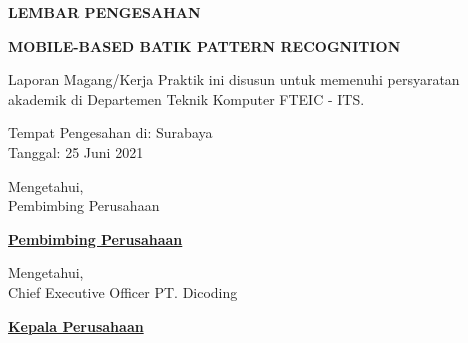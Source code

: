 \begin{center}
  {\Large \textbf{LEMBAR PENGESAHAN}}
  \vspace{6ex}


  {\large \textbf{MOBILE-BASED BATIK PATTERN RECOGNITION}}
  \vspace{6ex}

  Laporan Magang/Kerja Praktik ini disusun untuk memenuhi persyaratan akademik di Departemen Teknik Komputer FTEIC - ITS.
  \vspace{2ex}

  Tempat Pengesahan di: Surabaya \\
  Tanggal: 25 Juni 2021
  \vspace{8ex}

  Mengetahui, \\
  Pembimbing Perusahaan
  \vspace{12ex}

  \textbf{\underline{Pembimbing Perusahaan}}
  \vspace{8ex}

  Mengetahui, \\
  Chief Executive Officer PT. Dicoding
  \vspace{12ex}

  \textbf{\underline{Kepala Perusahaan}}

\end{center}
